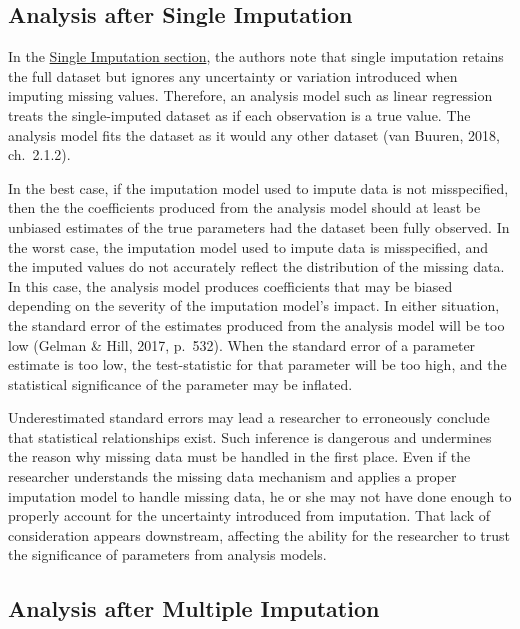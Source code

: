 \documentclass[12pt,oneside]{chicagocapstone}
\begin{document}
\subsection*{Analysis after Single
Imputation}\label{background-analysis-single}

In the \protect\hyperlink{background-single-imputation}{Single
Imputation section}, the authors note that single imputation retains the
full dataset but ignores any uncertainty or variation introduced when
imputing missing values. Therefore, an analysis model such as linear
regression treats the single-imputed dataset as if each observation is a
true value. The analysis model fits the dataset as it would any other
dataset (van Buuren, 2018, ch.~2.1.2).

In the best case, if the imputation model used to impute data is not
misspecified, then the the coefficients produced from the analysis model
should at least be unbiased estimates of the true parameters had the
dataset been fully observed. In the worst case, the imputation model
used to impute data is misspecified, and the imputed values do not
accurately reflect the distribution of the missing data. In this case,
the analysis model produces coefficients that may be biased depending on
the severity of the imputation model's impact. In either situation, the
standard error of the estimates produced from the analysis model will be
too low (Gelman \& Hill, 2017, p.~532). When the standard error of a
parameter estimate is too low, the test-statistic for that parameter
will be too high, and the statistical significance of the parameter may
be inflated.

Underestimated standard errors may lead a researcher to erroneously
conclude that statistical relationships exist. Such inference is
dangerous and undermines the reason why missing data must be handled in
the first place. Even if the researcher understands the missing data
mechanism and applies a proper imputation model to handle missing data,
he or she may not have done enough to properly account for the
uncertainty introduced from imputation. That lack of consideration
appears downstream, affecting the ability for the researcher to trust
the significance of parameters from analysis models.

\subsection*{Analysis after Multiple
Imputation}\label{background-analysis-multiple}
\end{document}
